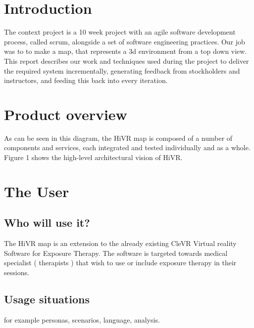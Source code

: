 \documentclass[11pt]{article}
\begin{document}





\section*{Introduction}
The context project is a 10 week project with an agile software development process, called scrum, 
alongside a set of software engineering practices. Our job was to to make a map, that represents a 3d environment from 
a top down view. This report describes our work and techniques used during the project to
deliver the required system incrementally, generating feedback from stockholders and instructors, and feeding this back into every iteration.



\section{Product overview}
As can be seen in this diagram, the HiVR map is composed of a number of components
and services, each integrated and tested individually and as a whole.
Figure 1 shows the high-level architectural vision of HiVR.


\section{The User}
\subsection{Who will use it?}
	The HiVR map is an extension to the already existing CleVR Virtual reality Software for Exposure Therapy.
    The software is targeted towards medical specialist ( therapists ) that wish to use or include exposure therapy in their sessions.
\subsection{Usage situations}
	for example personas, scenarios, language, analysis.
\end{document}
